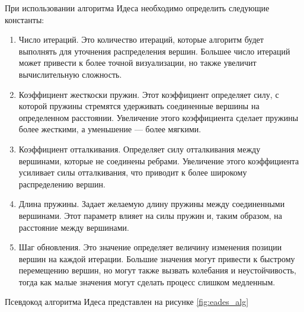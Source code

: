 \documentclass[14pt, russian]{scrartcl}
\begin{document}
При использовании алгоритма Идеса необходимо определить следующие константы:

\begin{enumerate}
  \item{Число итераций. Это количество итераций, которые алгоритм будет выполнять для уточнения распределения вершин. Большее число итераций может привести к более точной визуализации, но также увеличит вычислительную сложность.}
  \item{Коэффициент жесткоски пружин. Этот коэффициент определяет силу, с которой пружины стремятся удерживать соединенные вершины на определенном расстоянии. Увеличение этого коэффициента сделает пружины более жесткими, а уменьшение — более мягкими.}
  \item{Коэффициент отталкивания. Определяет силу отталкивания между вершинами, которые не соединены ребрами. Увеличение этого коэффициента усиливает силы отталкивания, что приводит к более широкому распределению вершин.}
  \item{Длина пружины. Задает желаемую длину пружины между соединенными вершинами. Этот параметр влияет на силы пружин и, таким образом, на расстояние между вершинами. }
  \item{Шаг обновления. Это значение определяет величину изменения позиции вершин на каждой итерации. Большие значения могут привести к быстрому перемещению вершин, но могут также вызвать колебания и неустойчивость, тогда как малые значения могут сделать процесс слишком медленным.}
\end{enumerate}

Псевдокод алгоритма Идеса представлен на рисунке \ref{fig:eades_alg}
\end{document}
